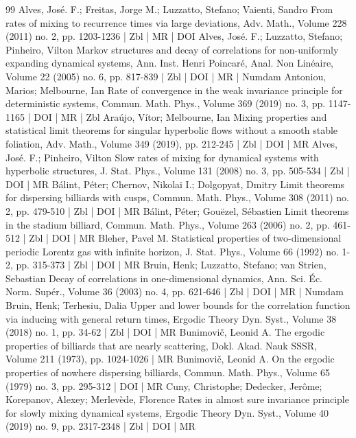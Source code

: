 \begin{thebibliography}{99}
Alves, José. F.; Freitas, Jorge M.; Luzzatto, Stefano; Vaienti, Sandro From rates of mixing to recurrence times via large deviations, Adv. Math., Volume 228 (2011) no. 2, pp. 1203-1236 | Zbl | MR | DOI
Alves, José. F.; Luzzatto, Stefano; Pinheiro, Vilton Markov structures and decay of correlations for non-uniformly expanding dynamical systems, Ann. Inst. Henri Poincaré, Anal. Non Linéaire, Volume 22 (2005) no. 6, pp. 817-839 | Zbl | DOI | MR | Numdam
Antoniou, Marios; Melbourne, Ian Rate of convergence in the weak invariance principle for deterministic systems, Commun. Math. Phys., Volume 369 (2019) no. 3, pp. 1147-1165 | DOI | MR | Zbl
Araújo, Vítor; Melbourne, Ian Mixing properties and statistical limit theorems for singular hyperbolic flows without a smooth stable foliation, Adv. Math., Volume 349 (2019), pp. 212-245 | Zbl | DOI | MR
Alves, José. F.; Pinheiro, Vilton Slow rates of mixing for dynamical systems with hyperbolic structures, J. Stat. Phys., Volume 131 (2008) no. 3, pp. 505-534 | Zbl | DOI | MR
Bálint, Péter; Chernov, Nikolai I.; Dolgopyat, Dmitry Limit theorems for dispersing billiards with cusps, Commun. Math. Phys., Volume 308 (2011) no. 2, pp. 479-510 | Zbl | DOI | MR
Bálint, Péter; Gouëzel, Sébastien Limit theorems in the stadium billiard, Commun. Math. Phys., Volume 263 (2006) no. 2, pp. 461-512 | Zbl | DOI | MR
Bleher, Pavel M. Statistical properties of two-dimensional periodic Lorentz gas with infinite horizon, J. Stat. Phys., Volume 66 (1992) no. 1-2, pp. 315-373 | Zbl | DOI | MR
Bruin, Henk; Luzzatto, Stefano; van Strien, Sebastian Decay of correlations in one-dimensional dynamics, Ann. Sci. Éc. Norm. Supér., Volume 36 (2003) no. 4, pp. 621-646 | Zbl | DOI | MR | Numdam
Bruin, Henk; Terhesiu, Dalia Upper and lower bounds for the correlation function via inducing with general return times, Ergodic Theory Dyn. Syst., Volume 38 (2018) no. 1, pp. 34-62 | Zbl | DOI | MR
Bunimovič, Leonid A. The ergodic properties of billiards that are nearly scattering, Dokl. Akad. Nauk SSSR, Volume 211 (1973), pp. 1024-1026 | MR
Bunimovič, Leonid A. On the ergodic properties of nowhere dispersing billiards, Commun. Math. Phys., Volume 65 (1979) no. 3, pp. 295-312 | DOI | MR
Cuny, Christophe; Dedecker, Jerôme; Korepanov, Alexey; Merlevède, Florence Rates in almost sure invariance principle for slowly mixing dynamical systems, Ergodic Theory Dyn. Syst., Volume 40 (2019) no. 9, pp. 2317-2348 | Zbl | DOI | MR

\end{thebibliography}
